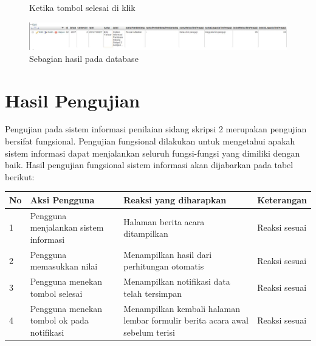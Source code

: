 \begin{enumerate}
\begin{figure}[H]
			\caption{Ketika tombol selesai di klik}
			\label{fig:selesaiisi}
		\end{figure}
		\begin{figure}[H]
			\centering
			\includegraphics[scale=0.5]{Gambar/hasildatabase}
			\caption{Sebagian hasil pada database}
			\label{fig:hasildatabase}
		\end{figure}
	\end{enumerate}
	
\section{Hasil Pengujian}
\label{sec:hasilUji}

	Pengujian pada sistem informasi penilaian sidang skripsi 2 merupakan pengujian bersifat fungsional. Pengujian fungsional dilakukan untuk mengetahui apakah sistem informasi dapat menjalankan seluruh fungsi-fungsi yang dimiliki dengan baik. Hasil pengujian fungsional sistem informasi akan dijabarkan pada tabel berikut:
	
	\begin{tabular}{| m{0.75cm} | m{7cm} | m{5cm} | m{3cm} |}
		\hline
		No & Aksi Pengguna & Reaksi yang diharapkan & Keterangan \\
		\hline
		1 & Pengguna menjalankan sistem informasi & Halaman berita acara ditampilkan & Reaksi sesuai \\
		\hline
		2 & Pengguna memasukkan nilai & Menampilkan hasil dari perhitungan otomatis & Reaksi sesuai \\
		\hline
		3 & Pengguna menekan tombol selesai & Menampilkan notifikasi data telah tersimpan & Reaksi sesuai \\
		\hline
		4 & Pengguna menekan tombol ok pada notifikasi & Menampilkan kembali halaman lembar formulir berita acara awal sebelum terisi & Reaksi sesuai \\
		\hline
	\end{tabular}
